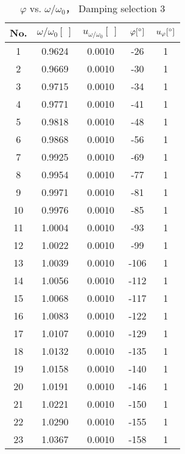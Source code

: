         \begin{table}[H]
        \centering
            \begin{tabular}{|c|c|c|c|c|}
                \hline
                No. & $\omega/\omega_0[\ ]$ & $u_{\omega/\omega_0}[\ ]$ & $\varphi[^\circ]$ & $u_{\varphi}[^\circ]$\\\hline
                1 & 0.9624 & 0.0010 & -26 & 1\\\hline
                2 & 0.9669 & 0.0010 & -30 & 1\\\hline
                3 & 0.9715 & 0.0010 & -34 & 1\\\hline
                4 & 0.9771 & 0.0010 & -41 & 1\\\hline
                5 & 0.9818 & 0.0010 & -48 & 1\\\hline
                6 & 0.9868 & 0.0010 & -56 & 1\\\hline
                7 & 0.9925 & 0.0010 & -69 & 1\\\hline
                8 & 0.9954 & 0.0010 & -77 & 1\\\hline
                9 & 0.9971 & 0.0010 & -81 & 1\\\hline
                10 & 0.9976 & 0.0010 & -85 & 1\\\hline
                11 & 1.0004 & 0.0010 & -93 & 1\\\hline
                12 & 1.0022 & 0.0010 & -99 & 1\\\hline
                13 & 1.0039 & 0.0010 & -106 & 1\\\hline
                14 & 1.0056 & 0.0010 & -112 & 1\\\hline
                15 & 1.0068 & 0.0010 & -117 & 1\\\hline
                16 & 1.0083 & 0.0010 & -122 & 1\\\hline
                17 & 1.0107 & 0.0010 & -129 & 1\\\hline
                18 & 1.0132 & 0.0010 & -135 & 1\\\hline
                19 & 1.0158 & 0.0010 & -140 & 1\\\hline
                20 & 1.0191 & 0.0010 & -146 & 1\\\hline
                21 & 1.0221 & 0.0010 & -150 & 1\\\hline
                22 & 1.0290 & 0.0010 & -155 & 1\\\hline
                23 & 1.0367 & 0.0010 & -158 & 1\\\hline
            \end{tabular}
            \caption{$\varphi$ vs. $\omega/\omega_0$， Damping selection 3}\label{data_phi3}
        \end{table}


